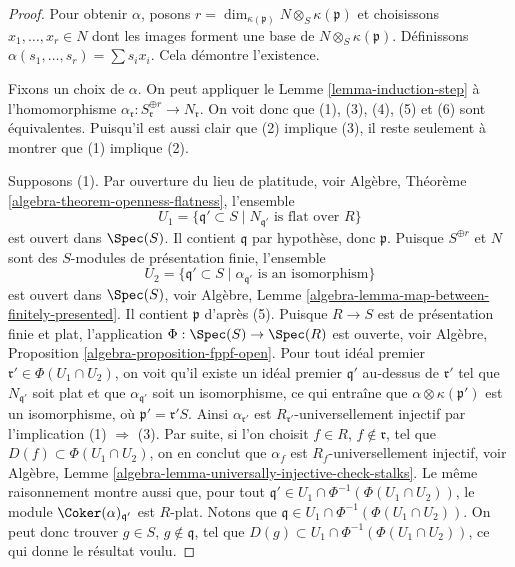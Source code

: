 \begin{proof}
Pour obtenir $\alpha$, posons
$r = \dim_{\kappa(\mathfrak p)} N \otimes_S \kappa(\mathfrak p)$ et choisissons
$x_1, \ldots, x_r \in N$ dont les images forment une base de\newline
$N \otimes_S \kappa(\mathfrak p)$. Définissons
$\alpha(s_1, \ldots, s_r) = \sum s_i x_i$. Cela démontre l'existence.

\medskip\noindent
Fixons un choix de $\alpha$.
On peut appliquer
le Lemme \ref{lemma-induction-step}
à l'homomorphisme
$\alpha_{\mathfrak r} : S_{\mathfrak r}^{\oplus r} \to N_{\mathfrak r}$.
On voit donc que (1), (3), (4), (5) et (6) sont équivalentes.
Puisqu'il est aussi clair que (2) implique (3), il reste seulement
à montrer que (1) implique (2).

\medskip\noindent
Supposons (1). Par ouverture du lieu de platitude, voir
Algèbre, Théorème \ref{algebra-theorem-openness-flatness},
l'ensemble
$$
U_1 = \{\mathfrak q' \subset S \mid N_{\mathfrak q'}\text{ is flat over }R\}
$$
est ouvert dans $\Spec(S)$. Il contient $\mathfrak q$ par hypothèse,
donc $\mathfrak p$. Puisque $S^{\oplus r}$ et $N$ sont des
$S$-modules de présentation finie, l'ensemble
$$
U_2 = \{\mathfrak q' \subset S \mid
\alpha_{\mathfrak q'}\text{ is an isomorphism}\}
$$
est ouvert dans $\Spec(S)$, voir
Algèbre, Lemme \ref{algebra-lemma-map-between-finitely-presented}.
Il contient $\mathfrak p$ d'après (5). Puisque $R \to S$
est de présentation finie et plat, l'application
$\Phi : \Spec(S) \to \Spec(R)$ est ouverte, voir
Algèbre, Proposition \ref{algebra-proposition-fppf-open}.
Pour tout idéal premier $\mathfrak r' \in \Phi(U_1 \cap U_2)$, on voit
qu'il existe un idéal premier $\mathfrak q'$ au-dessus de $\mathfrak r'$ tel que
$N_{\mathfrak q'}$ soit plat et que $\alpha_{\mathfrak q'}$ soit
un isomorphisme, ce qui entraîne que $\alpha \otimes \kappa(\mathfrak p')$
est un isomorphisme, où $\mathfrak p' = \mathfrak r' S$. Ainsi
$\alpha_{\mathfrak r'}$ est $R_{\mathfrak r'}$-universellement injectif
par l'implication (1) $\Rightarrow$ (3).
Par suite, si l'on choisit $f \in R$, $f \not \in \mathfrak r$, tel que
$D(f) \subset \Phi(U_1 \cap U_2)$, on en conclut que
$\alpha_f$ est $R_f$-universellement injectif, voir
Algèbre, Lemme \ref{algebra-lemma-universally-injective-check-stalks}.
Le même raisonnement montre aussi que, pour tout
$\mathfrak q' \in U_1 \cap \Phi^{-1}(\Phi(U_1 \cap U_2))$,
le module $\Coker(\alpha)_{\mathfrak q'}$ est $R$-plat.
Notons que $\mathfrak q \in U_1 \cap \Phi^{-1}(\Phi(U_1 \cap U_2))$.
On peut donc trouver $g \in S$, $g \not \in \mathfrak q$, tel
que $D(g) \subset U_1 \cap \Phi^{-1}(\Phi(U_1 \cap U_2))$,
ce qui donne le résultat voulu.
\end{proof}


